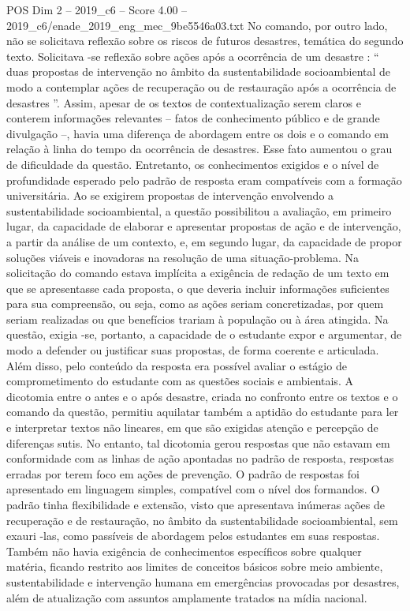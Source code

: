 \begin{textsample}{POS Dim 2 – 2019\_c6 – Score 4.00 – 2019\_c6/enade\_2019\_eng\_mec\_9be5546a03.txt}
No comando, por outro lado, não se solicitava reflexão sobre os riscos de futuros desastres, temática do segundo texto.
Solicitava -se reflexão sobre ações após a ocorrência de um desastre : “ duas propostas de intervenção no âmbito da sustentabilidade socioambiental de modo a contemplar ações de recuperação ou de restauração após a ocorrência de desastres ”.
Assim, apesar de os textos de contextualização serem claros e conterem informações relevantes – fatos de conhecimento público e de grande divulgação –, havia uma diferença de abordagem entre os dois e o comando em relação à linha do tempo da ocorrência de desastres.
Esse fato aumentou o grau de dificuldade da questão.
Entretanto, os conhecimentos exigidos e o nível de profundidade esperado pelo padrão de resposta eram compatíveis com a formação universitária.
Ao se exigirem propostas de intervenção envolvendo a sustentabilidade socioambiental, a questão possibilitou a avaliação, em primeiro lugar, da capacidade de elaborar e apresentar propostas de ação e de intervenção, a partir da análise de um contexto, e, em segundo lugar, da capacidade de propor soluções viáveis e inovadoras na resolução de uma situação-problema.
Na solicitação do comando estava implícita a exigência de redação de um texto em que se apresentasse cada proposta, o que deveria incluir informações suficientes para sua compreensão, ou seja, como as ações seriam concretizadas, por quem seriam realizadas ou que benefícios trariam à população ou à área atingida.
Na questão, exigia -se, portanto, a capacidade de o estudante expor e argumentar, de modo a defender ou justificar suas propostas, de forma coerente e articulada.
Além disso, pelo conteúdo da resposta era possível avaliar o estágio de comprometimento do estudante com as questões sociais e ambientais.
A dicotomia entre o antes e o após desastre, criada no confronto entre os textos e o comando da questão, permitiu aquilatar também a aptidão do estudante para ler e interpretar textos não lineares, em que são exigidas atenção e percepção de diferenças sutis.
No entanto, tal dicotomia gerou respostas que não estavam em conformidade com as linhas de ação apontadas no padrão de resposta, respostas erradas por terem foco em ações de prevenção.
O padrão de respostas foi apresentado em linguagem simples, compatível com o nível dos formandos.
O padrão tinha flexibilidade e extensão, visto que apresentava inúmeras ações de recuperação e de restauração, no âmbito da sustentabilidade socioambiental, sem exauri -las, como passíveis de abordagem pelos estudantes em suas respostas.
Também não havia exigência de conhecimentos específicos sobre qualquer matéria, ficando restrito aos limites de conceitos básicos sobre meio ambiente, sustentabilidade e intervenção humana em emergências provocadas por desastres, além de atualização com assuntos amplamente tratados na mídia nacional.

\end{textsample}
